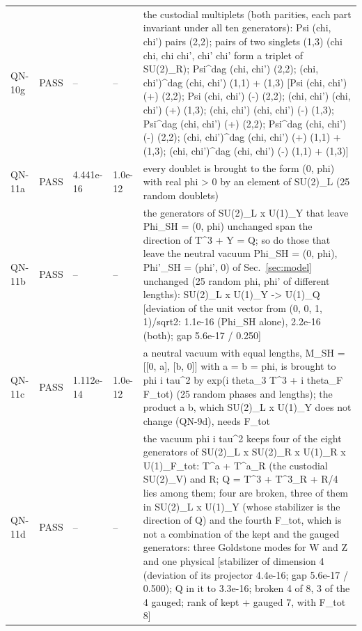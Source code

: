 \documentclass[aps,prd,onecolumn,superscriptaddress,nofootinbib,floatfix,longbibliography]{revtex4-2}
\begin{document}
\begin{longtable}{p{}p{}p{}p{}p{}}
QN-10g & PASS & -- & -- & the custodial multiplets (both parities, each part invariant under all ten generators): Psi (chi, chi') pairs (2,2); pairs of two singlets (1,3) (chi chi, chi chi', chi' chi' form a triplet of SU(2)\_R); Psi\textasciicircum{}dag (chi, chi') (2,2); (chi, chi')\textasciicircum{}dag (chi, chi') (1,1) + (1,3) [Psi (chi, chi') (+) (2,2); Psi (chi, chi') (-) (2,2); (chi, chi') (chi, chi') (+) (1,3); (chi, chi') (chi, chi') (-) (1,3); Psi\textasciicircum{}dag (chi, chi') (+) (2,2); Psi\textasciicircum{}dag (chi, chi') (-) (2,2); (chi, chi')\textasciicircum{}dag (chi, chi') (+) (1,1) + (1,3); (chi, chi')\textasciicircum{}dag (chi, chi') (-) (1,1) + (1,3)] \\
QN-11a & PASS & 4.441e-16 & 1.0e-12 & every doublet is brought to the form (0, phi) with real phi \textgreater{} 0 by an element of SU(2)\_L (25 random doublets) \\
QN-11b & PASS & -- & -- & the generators of SU(2)\_L x U(1)\_Y that leave Phi\_SH = (0, phi) unchanged span the direction of T\textasciicircum{}3 + Y = Q; so do those that leave the neutral vacuum Phi\_SH = (0, phi), Phi'\_SH = (phi', 0) of Sec.~\ref{sec:model} unchanged (25 random phi, phi' of different lengths): SU(2)\_L x U(1)\_Y -\textgreater{} U(1)\_Q [deviation of the unit vector from (0, 0, 1, 1)/sqrt2: 1.1e-16 (Phi\_SH alone), 2.2e-16 (both); gap 5.6e-17 / 0.250] \\
QN-11c & PASS & 1.112e-14 & 1.0e-12 & a neutral vacuum with equal lengths, M\_SH = [[0, a], [b, 0]] with \textbar{}a\textbar{} = \textbar{}b\textbar{} = phi, is brought to phi i tau\textasciicircum{}2 by exp(i theta\_3 T\textasciicircum{}3 + i theta\_F F\_tot) (25 random phases and lengths); the product a b, which SU(2)\_L x U(1)\_Y does not change (QN-9d), needs F\_tot \\
QN-11d & PASS & -- & -- & the vacuum phi i tau\textasciicircum{}2 keeps four of the eight generators of SU(2)\_L x SU(2)\_R x U(1)\_R x U(1)\_F\_tot: T\textasciicircum{}a + T\textasciicircum{}a\_R (the custodial SU(2)\_V) and R; Q = T\textasciicircum{}3 + T\textasciicircum{}3\_R + R/4 lies among them; four are broken, three of them in SU(2)\_L x U(1)\_Y (whose stabilizer is the direction of Q) and the fourth F\_tot, which is not a combination of the kept and the gauged generators: three Goldstone modes for W and Z and one physical [stabilizer of dimension 4 (deviation of its projector 4.4e-16; gap 5.6e-17 / 0.500); Q in it to 3.3e-16; broken 4 of 8, 3 of the 4 gauged; rank of kept + gauged 7, with F\_tot 8] \\

\end{longtable}
\end{document}
